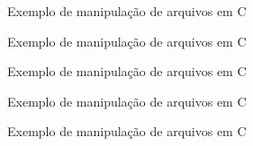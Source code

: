 \begin{frame}[fragile]{Exemplo de manipulação de arquivos em C}
\end{frame}

\begin{frame}[fragile]{Exemplo de manipulação de arquivos em C}
\end{frame}

\begin{frame}[fragile]{Exemplo de manipulação de arquivos em C}
\end{frame}

\begin{frame}[fragile]{Exemplo de manipulação de arquivos em C}
\end{frame}

\begin{frame}[fragile]{Exemplo de manipulação de arquivos em C}
\end{frame}


